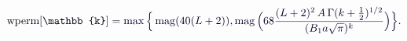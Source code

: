 \documentclass[12pt]{article}
\begin{document}
\makeatletter
\renewcommand*{\@textcolor}[3]{%
  \protect\leavevmode
  \begingroup
    \color#1{#2}#3%
  \endgroup
}
\makeatother
\begin{displaymath}
\mathcolor[RGB]{0,0,15}{\text{wperm}[\mathbb{k}]} \mathcolor[RGB]{0,0,30}{=} \mathcolor[RGB]{0,0,45}{\max\Big\{\mathop{\rm{mag}}(40(L+2)),\mathop{\rm{mag}}\Big(68\frac{(L+2)^2\,A\,\Gamma(k+\frac{1}{2})^{1/2}}{(B_1a\sqrt{\pi})^k}\Big)\Big\}.}
\end{displaymath}
\end{document}
